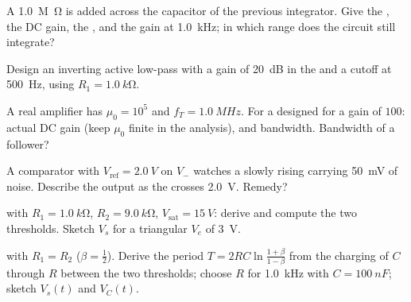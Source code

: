 \begin{exercise}[$\star\star$]\label{exo:b1:operational-amplifier:7}
A \qty{1.0}{M\ohm}  is added across the capacitor of the previous
integrator. Give the , the DC gain, the , and the gain at \qty{1.0}{kHz}; in which range does the
circuit still integrate?
\end{exercise}

\begin{exercise}[$\star\star$]\label{exo:b1:operational-amplifier:8}
Design an inverting active low-pass with a gain of \qty{20}{dB} in the
 and a cutoff at \qty{500}{Hz}, using $R_1 = \qty{1.0}{k\ohm}$.
\end{exercise}

\begin{exercise}[$\star\star$]\label{exo:b1:operational-amplifier:9}
A real amplifier has $\mu_0 = 10^5$ and $f_T = \qty{1.0}{MHz}$. For a
 designed for a gain of $100$: actual DC gain
(keep $\mu_0$ finite in the analysis), and bandwidth. Bandwidth of a
follower?
\end{exercise}

\begin{exercise}[$\star\star\star$]\label{exo:b1:operational-amplifier:10}
A comparator with $V_{\mathrm{ref}} = \qty{2.0}{V}$ on $V_-$ watches a
slowly rising  carrying \qty{50}{mV} of noise. Describe the output
as the  crosses \qty{2.0}{V}. Remedy?
\end{exercise}

\begin{exercise}[$\star\star\star$]\label{exo:b1:operational-amplifier:11}
 with $R_1 = \qty{1.0}{k\ohm}$, $R_2 = \qty{9.0}{k\ohm}$,
$V_{\mathrm{sat}} = \qty{15}{V}$: derive and compute the two thresholds.
Sketch $V_s$ for a triangular $V_e$ of  \qty{3}{V}.
\end{exercise}

\begin{exercise}[$\star\star\star$]\label{exo:b1:operational-amplifier:12}
 with $R_1 = R_2$ ($\beta = \tfrac12$). Derive the
period $T = 2RC\ln\frac{1 + \beta}{1 - \beta}$ from the charging of $C$
through $R$ between the two thresholds; choose $R$ for \qty{1.0}{kHz}
with $C = \qty{100}{nF}$; sketch $V_s(t)$ and $V_C(t)$.
\end{exercise}

